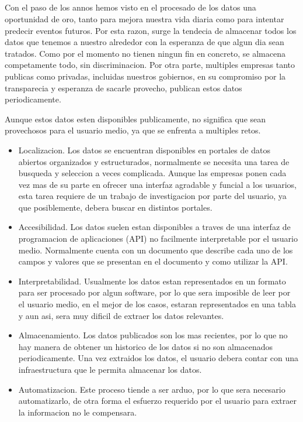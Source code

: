 \subsection*{}
Con el paso de los annos hemos visto en el procesado de los datos una oportunidad de oro, tanto para mejora nuestra vida diaria como para intentar predecir
eventos futuros. Por esta razon, surge la tendecia de almacenar todos los datos que tenemos a nuestro alrededor con la esperanza de que algun dia sean tratados.
Como por el momento no tienen ningun fin en concreto, se almacena competamente todo, sin discriminacion.
Por otra parte, multiples empresas tanto publicas como privadas, incluidas nuestros gobiernos, en su compromiso por la transparecia y esperanza de sacarle provecho, publican estos datos periodicamente.

Aunque estos datos esten disponibles publicamente, no significa que sean provechosos para el usuario medio, ya que se enfrenta a multiples retos.
\begin{itemize}
    \item Localizacion. Los datos se encuentran disponibles en portales de datos abiertos organizados y estructurados, normalmente se necesita una tarea de busqueda y seleccion
    a veces complicada. Aunque las empresas ponen cada vez mas de su parte en ofrecer una interfaz agradable y funcial a los usuarios, esta tarea requiere de un trabajo de investigacion por parte del usuario,
    ya que posiblemente, debera buscar en distintos portales.
    \item Accesibilidad. Los datos suelen estan disponibles a traves de una interfaz de programacion de aplicaciones (API) no facilmente interpretable por el usuario medio. Normalmente cuenta con un documento que describe
    cada uno de los campos y valores que se presentan en el documento y como utilizar la API.
    \item Interpretabilidad. Usualmente los datos estan representados en un formato para ser procesado por algun software, por lo que sera imposible de leer por el usuario medio,
    en el mejor de los casos, estaran representados en una tabla y aun asi, sera muy dificil de extraer los datos relevantes.
    \item Almacenamiento. Los datos publicados son los mas recientes, por lo que no hay manera de obtener un historico de los datos si no son almacenados periodicamente. Una vez extraidos los datos, el usuario debera 
    contar con una infraestructura que le permita almacenar los datos.
    \item Automatizacion. Este proceso tiende a ser arduo, por lo que sera necesario automatizarlo, de otra forma el esfuerzo requerido por el usuario para extraer la informacion no le compensara.
     
\end{itemize}


